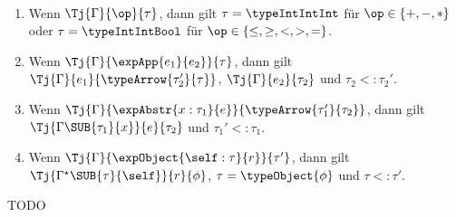 \begin{lemma} \label{lemma:Lort:Umkehrung_der_Typrelation} \
  \begin{enumerate}
    \item Wenn $\Tj{\Gamma}{\op}{\tau}$, dann gilt $\tau=\typeIntIntInt$ f\"ur $\op\in\{+,-,*\}$
          oder $\tau=\typeIntIntBool$ f\"ur $\op\in\{\le,\ge,<,>,=\}$.
    \item Wenn $\Tj{\Gamma}{\expApp{e_1}{e_2}}{\tau}$, dann gilt $\Tj{\Gamma}{e_1}{\typeArrow{\tau_2'}{\tau}}$,
          $\Tj{\Gamma}{e_2}{\tau_2}$ und $\tau_2 <: \tau_2'$.
    \item Wenn $\Tj{\Gamma}{\expAbstr{x:\tau_1}{e}}{\typeArrow{\tau_1'}{\tau_2}}$, dann gilt
          $\Tj{\Gamma\SUB{\tau_1}{x}}{e}{\tau_2}$ und $\tau_1' <: \tau_1$.
    \item Wenn $\Tj{\Gamma}{\expObject{\self:\tau}{r}}{\tau'}$, dann gilt
          $\Tj{\Gamma^\star\SUB{\tau}{\self}}{r}{\phi}$, $\tau = \typeObject{\phi}$ und $\tau <: \tau'$.
  \end{enumerate}
\end{lemma}

\begin{beweis}
  TODO
\end{beweis}

